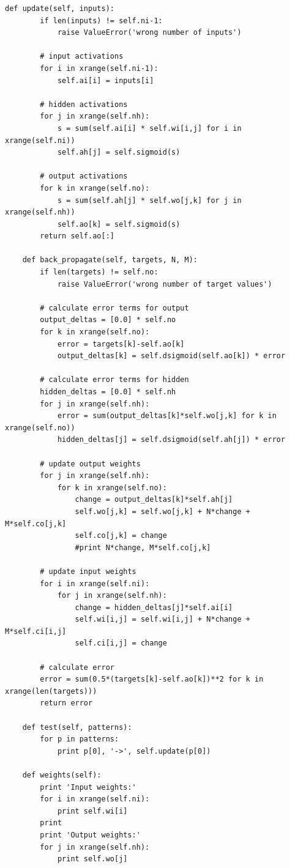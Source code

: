 \documentclass[justified,sixbynine]{tufte-book}
\def\ft{\small\tt}
\theoremstyle{plain}%
\theoremstyle{definition}
\theoremstyle{remark}
\begin{document}
\begin{fullwidth}
\begin{lstlisting}[caption={in file: {\ft nlib.py}}]
    def update(self, inputs):
        if len(inputs) != self.ni-1:
            raise ValueError('wrong number of inputs')

        # input activations
        for i in xrange(self.ni-1):
            self.ai[i] = inputs[i]

        # hidden activations
        for j in xrange(self.nh):
            s = sum(self.ai[i] * self.wi[i,j] for i in xrange(self.ni))
            self.ah[j] = self.sigmoid(s)

        # output activations
        for k in xrange(self.no):
            s = sum(self.ah[j] * self.wo[j,k] for j in xrange(self.nh))
            self.ao[k] = self.sigmoid(s)
        return self.ao[:]

    def back_propagate(self, targets, N, M):
        if len(targets) != self.no:
            raise ValueError('wrong number of target values')

        # calculate error terms for output
        output_deltas = [0.0] * self.no
        for k in xrange(self.no):
            error = targets[k]-self.ao[k]
            output_deltas[k] = self.dsigmoid(self.ao[k]) * error

        # calculate error terms for hidden
        hidden_deltas = [0.0] * self.nh
        for j in xrange(self.nh):
            error = sum(output_deltas[k]*self.wo[j,k] for k in xrange(self.no))
            hidden_deltas[j] = self.dsigmoid(self.ah[j]) * error

        # update output weights
        for j in xrange(self.nh):
            for k in xrange(self.no):
                change = output_deltas[k]*self.ah[j]
                self.wo[j,k] = self.wo[j,k] + N*change + M*self.co[j,k]
                self.co[j,k] = change
                #print N*change, M*self.co[j,k]

        # update input weights
        for i in xrange(self.ni):
            for j in xrange(self.nh):
                change = hidden_deltas[j]*self.ai[i]
                self.wi[i,j] = self.wi[i,j] + N*change + M*self.ci[i,j]
                self.ci[i,j] = change

        # calculate error
        error = sum(0.5*(targets[k]-self.ao[k])**2 for k in xrange(len(targets)))
        return error

    def test(self, patterns):
        for p in patterns:
            print p[0], '->', self.update(p[0])

    def weights(self):
        print 'Input weights:'
        for i in xrange(self.ni):
            print self.wi[i]
        print
        print 'Output weights:'
        for j in xrange(self.nh):
            print self.wo[j]


\end{lstlisting}
\end{fullwidth}
\end{document}
